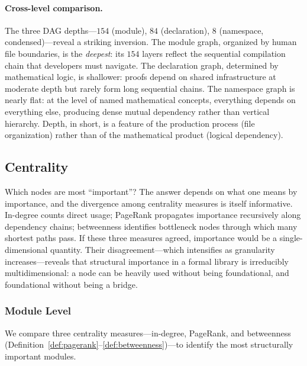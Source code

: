 \paragraph{Cross-level comparison.} The three DAG depths---$154$ (module), $84$ (declaration), $8$ (namespace, condensed)---reveal a striking inversion. The module graph, organized by human file boundaries, is the \emph{deepest}: its $154$ layers reflect the sequential compilation chain that developers must navigate. The declaration graph, determined by mathematical logic, is shallower: proofs depend on shared infrastructure at moderate depth but rarely form long sequential chains. The namespace graph is nearly flat: at the level of named mathematical concepts, everything depends on everything else, producing dense mutual dependency rather than vertical hierarchy. Depth, in short, is a feature of the production process (file organization) rather than of the mathematical product (logical dependency).

\subsection{Centrality}
\label{sec:sa-centrality}

Which nodes are most ``important''? The answer depends on what one means by importance, and the divergence among centrality measures is itself informative. In-degree counts direct usage; PageRank propagates importance recursively along dependency chains; betweenness identifies bottleneck nodes through which many shortest paths pass. If these three measures agreed, importance would be a single-dimensional quantity. Their disagreement---which intensifies as granularity increases---reveals that structural importance in a formal library is irreducibly multidimensional: a node can be heavily used without being foundational, and foundational without being a bridge.

\subsubsection{Module Level}
\label{sec:centrality}

We compare three centrality measures---in-degree, PageRank, and betweenness (Definition~\ref{def:pagerank}--\ref{def:betweenness})---to identify the most structurally important modules.

